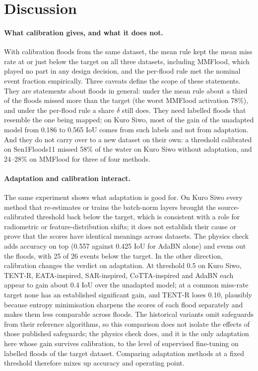 \documentclass[a4paper,fleqn]{cas-sc}
\begin{document}
\section{Discussion}
\label{sec:discussion}

\paragraph{What calibration gives, and what it does not.} With calibration floods from the same dataset, the mean rule kept the mean miss rate at or just below the target on all three datasets, including MMFlood, which played no part in any design decision, and the per-flood rule met the nominal event fraction empirically. Three caveats define the scope of these statements. They are statements about floods in general: under the mean rule about a third of the floods missed more than the target (the worst MMFlood activation 78\%), and under the per-flood rule a share $\delta$ still does. They need labelled floods that resemble the one being mapped; on Kuro Siwo, most of the gain of the unadapted model from 0.186 to 0.565 IoU comes from such labels and not from adaptation. And they do not carry over to a new dataset on their own: a threshold calibrated on Sen1Floods11 missed 58\% of the water on Kuro Siwo without adaptation, and 24--28\% on MMFlood for three of four methods.

\paragraph{Adaptation and calibration interact.} The same experiment shows what adaptation is good for. On Kuro Siwo every method that re-estimates or trains the batch-norm layers brought the source-calibrated threshold back below the target, which is consistent with a role for radiometric or feature-distribution shifts; it does not establish their cause or prove that the scores have identical meanings across datasets. The physics check adds accuracy on top (0.557 against 0.425 IoU for AdaBN alone) and evens out the floods, with 25 of 26 events below the target. In the other direction, calibration changes the verdict on adaptation. At threshold 0.5 on Kuro Siwo, TENT-R, EATA-inspired, SAR-inspired, CoTTA-inspired and AdaBN each appear to gain about 0.4 IoU over the unadapted model; at a common miss-rate target none has an established significant gain, and TENT-R loses 0.10, plausibly because entropy minimisation sharpens the scores of each flood separately and makes them less comparable across floods. The historical variants omit safeguards from their reference algorithms, so this comparison does not isolate the effects of those published safeguards; the physics check does, and it is the only adaptation here whose gain survives calibration, to the level of supervised fine-tuning on labelled floods of the target dataset. Comparing adaptation methods at a fixed threshold therefore mixes up accuracy and operating point.
\end{document}
